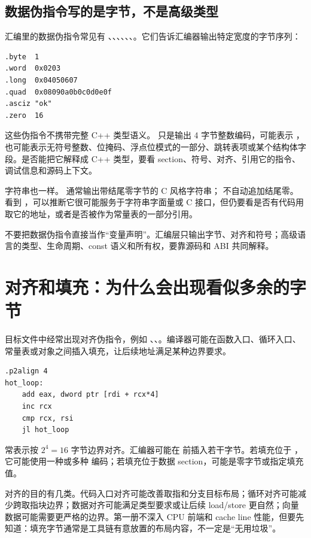 \subsection{数据伪指令写的是字节，不是高级类型}

汇编里的数据伪指令常见有 、、、、、、。它们告诉汇编器输出特定宽度的字节序列：

\begin{lstlisting}
.byte  1
.word  0x0203
.long  0x04050607
.quad  0x08090a0b0c0d0e0f
.asciz "ok"
.zero  16
\end{lstlisting}

这些伪指令不携带完整 C++ 类型语义。 只是输出 4 字节整数编码，可能表示 ，也可能表示无符号整数、位掩码、浮点位模式的一部分、跳转表项或某个结构体字段。是否能把它解释成 C++ 类型，要看 section、符号、对齐、引用它的指令、调试信息和源码上下文。

字符串也一样。 通常输出带结尾零字节的 C 风格字符串； 不自动追加结尾零。看到 ，可以推断它很可能服务于字符串字面量或 C 接口，但仍要看是否有代码用  取它的地址，或者是否被作为常量表的一部分引用。

\begin{warningbox}
不要把数据伪指令直接当作“变量声明”。汇编层只输出字节、对齐和符号；高级语言的类型、生命周期、const 语义和所有权，要靠源码和 ABI 共同解释。
\end{warningbox}

\section{对齐和填充：为什么会出现看似多余的字节}

目标文件中经常出现对齐伪指令，例如 、、。编译器可能在函数入口、循环入口、常量表或对象之间插入填充，让后续地址满足某种边界要求。

\begin{lstlisting}
.p2align 4
hot_loop:
    add eax, dword ptr [rdi + rcx*4]
    inc rcx
    cmp rcx, rsi
    jl hot_loop
\end{lstlisting}

 常表示按 \(2^4 = 16\) 字节边界对齐。汇编器可能在  前插入若干字节。若填充位于 ，它可能使用一种或多种  编码；若填充位于数据 section，可能是零字节或指定填充值。

对齐的目的有几类。代码入口对齐可能改善取指和分支目标布局；循环对齐可能减少跨取指块边界；数据对齐可能满足类型要求或让后续 load/store 更自然；向量数据可能需要更严格的边界。第一册不深入 CPU 前端和 cache line 性能，但要先知道：填充字节通常是工具链有意放置的布局内容，不一定是“无用垃圾”。

